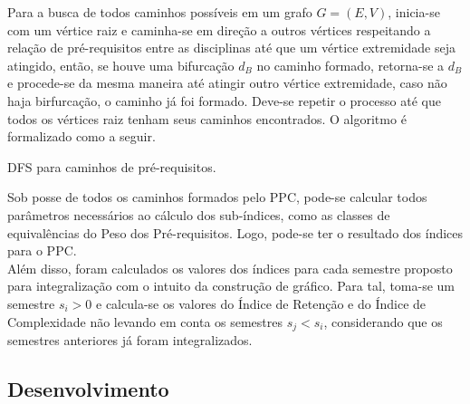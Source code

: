 \documentclass[a4paper, 12pt]{article}
\begin{document}
Para a busca de todos caminhos possíveis em um grafo $G = (E, V)$, inicia-se com um vértice raiz e caminha-se em direção a outros vértices respeitando a relação de 
pré-requisitos entre as disciplinas até que um vértice extremidade seja atingido, então, se houve uma bifurcação $d_B$ no caminho formado, retorna-se a $d_B$ e 
procede-se da mesma maneira até atingir outro vértice extremidade, caso não haja 
birfurcação, o caminho já foi formado. Deve-se repetir o processo até que todos 
os vértices raiz tenham seus caminhos encontrados. O algoritmo é formalizado como a seguir. \\

\begin{algorithm}[H]
\small
\SetAlgoNoLine
{}
\Retorna{$\Gamma$}
\caption{DFS para caminhos de pré-requisitos.}
\end{algorithm}

Sob posse de todos os caminhos formados pelo PPC, pode-se calcular todos parâmetros necessários ao cálculo dos sub-índices, como as classes de equivalências do Peso 
dos Pré-requisitos. Logo, pode-se ter o resultado dos índices para o PPC. \\

Além disso, foram calculados os valores dos índices para cada semestre proposto para integralização com o intuito da construção de gráfico. Para tal, toma-se um 
semestre $s_i > 0$ e calcula-se os valores do Índice de Retenção e do Índice de Complexidade não levando em conta os semestres $s_j < s_i$, considerando que os 
semestres anteriores já foram integralizados.

\subsection*{Desenvolvimento}
\end{document}
